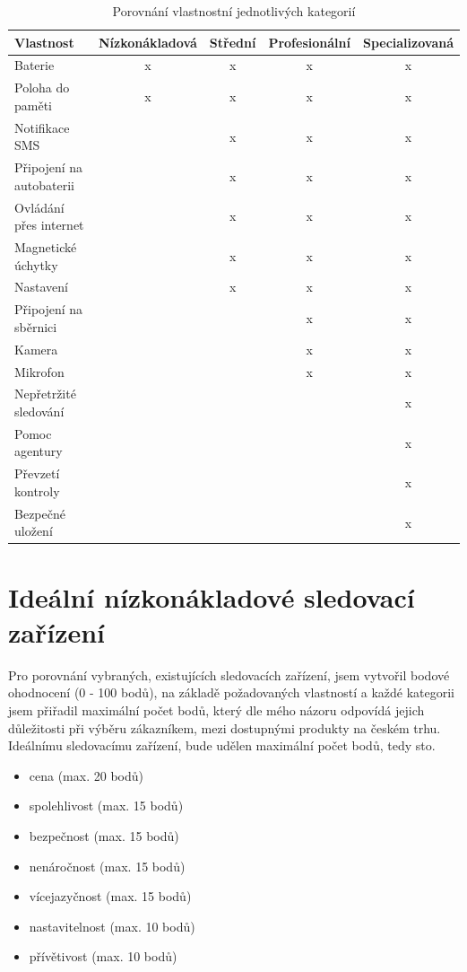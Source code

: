 \documentclass[FM,BP]{tulthesis}  %
\begin{document}
\renewcommand{\arraystretch}{1.5}
\begin{table}[H]
\begin{center}
\begin{tabular}{| l | c | c| c | c |}
\hline
Vlastnost & Nízkonákladová & Střední & Profesionální & Specializovaná\\
\hline
\hline
Baterie & x & x & x & x\\
\hline
Poloha do paměti & x & x & x & x\\
\hline
Notifikace SMS & & x & x & x\\
\hline
Připojení na autobaterii & & x & x & x\\
\hline
Ovládání přes internet & & x & x & x\\
\hline
Magnetické úchytky & & x & x & x\\
\hline
Nastavení & & x & x & x\\
\hline
Připojení na sběrnici & & & x & x\\
\hline
Kamera & & & x & x\\
\hline
Mikrofon & & & x & x\\
\hline
Nepřetržité sledování & & & & x\\
\hline
Pomoc agentury & & & & x\\
\hline
Převzetí kontroly & & & & x\\
\hline
Bezpečné uložení & & & & x\\
\hline
\end{tabular}
\end{center}
\caption{Porovnání vlastnostní jednotlivých kategorií}
\end{table}


\section{Ideální nízkonákladové sledovací zařízení}
Pro porovnání vybraných, existujících sledovacích zařízení, jsem vytvořil bodové ohodnocení (0 - 100 bodů), na základě požadovaných vlastností a každé kategorii jsem přiřadil maximální počet bodů, který dle mého názoru odpovídá jejich důležitosti při výběru zákazníkem, mezi dostupnými produkty na českém trhu. Ideálnímu sledovacímu zařízení, bude udělen maximální počet bodů, tedy sto.

\begin{itemize}
\item cena (max. 20 bodů)
\item spolehlivost (max. 15 bodů)
\item bezpečnost (max. 15 bodů)
\item nenáročnost (max. 15 bodů)
\item vícejazyčnost (max. 15 bodů)
\item nastavitelnost (max. 10 bodů)
\item přívětivost (max. 10 bodů)
\end{itemize}
\end{document}
